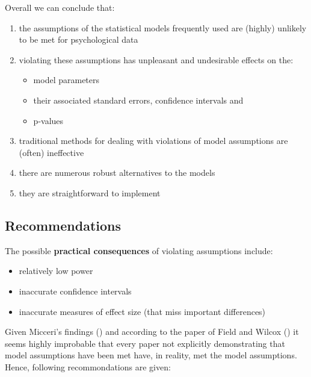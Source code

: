\documentclass[
]{article}
\providecommand{\tightlist}{%
  \setlength{\itemsep}{0pt}\setlength{\parskip}{0pt}}
\begin{document}
Overall we can conclude that:

\begin{enumerate}
\def\labelenumi{\arabic{enumi}.}
\tightlist
\item
  the assumptions of the statistical models frequently used are (highly) unlikely to be met for psychological data
\item
  violating these assumptions has unpleasant and undesirable effects on the:

  \begin{itemize}
  \tightlist
  \item
    model parameters
  \item
    their associated standard errors, confidence intervals and
  \item
    p-values
  \end{itemize}
\item
  traditional methods for dealing with violations of model assumptions are (often) ineffective
\item
  there are numerous robust alternatives to the models
\item
  they are straightforward to implement
\end{enumerate}

\subsection*{Recommendations}\label{recommendations}

The possible \textbf{practical consequences} of violating assumptions include:

\begin{itemize}
\tightlist
\item
  relatively low power
\item
  inaccurate confidence intervals
\item
  inaccurate measures of effect size (that miss important differences)
\end{itemize}

Given Micceri's findings () and according to the paper of Field and Wilcox () it seems highly improbable that every paper not explicitly demonstrating that model assumptions have been met have, in reality, met the model assumptions. Hence, following recommondations are given:
\end{document}
